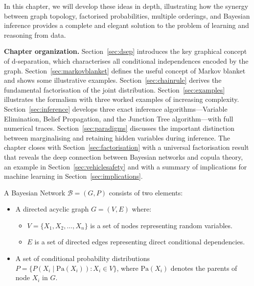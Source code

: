 In this chapter, we will develop these ideas in depth, illustrating how the synergy between graph topology, factorised probabilities, multiple orderings, and Bayesian inference provides a complete and elegant solution to the problem of learning and reasoning from data.

\textbf{Chapter organization.}
Section~\ref{sec:dsep} introduces the key graphical concept of
d-separation, which characterises all conditional independences encoded by the
graph. Section~\ref{sec:markovblanket} defines the useful concept of Markov blanket and shows some illustrative examples.  Section~\ref{sec:chainrule} derives the fundamental factorisation of the
joint distribution. Section~\ref{sec:examples} illustrates the formalism with
three worked examples of increasing complexity. Section~\ref{sec:inference}
develops three exact inference algorithms---Variable Elimination, Belief
Propagation, and the Junction Tree algorithm---with full numerical traces.
Section~\ref{sec:paradigms} discusses the important distinction between
marginalising and retaining hidden variables during inference. The chapter
closes with Section~\ref{sec:factorisation} with a universal factorisation
result that reveals the deep connection between Bayesian networks and copula
theory, an example in Section~\ref{sec:vehiclesafety} and with a summary of implications
for machine learning in Section~\ref{sec:implications}.

\begin{definition}
A Bayesian Network $\mathcal{B} = (G, P)$ consists of two elements:
\begin{itemize}
    \item A directed acyclic graph $G = (V, E)$ where:
    \begin{itemize}
        \item $V = \{X_1, X_2, \ldots, X_n\}$ is a set of nodes representing
              random variables.
        \item $E$ is a set of directed edges representing direct conditional
              dependencies.
    \end{itemize}
    \item A set of conditional probability distributions
          $P = \{P(X_i \mid \mathrm{Pa}(X_i)) : X_i \in V\}$,
          where $\mathrm{Pa}(X_i)$ denotes the parents of node $X_i$ in $G$.
\end{itemize}
\end{definition}

